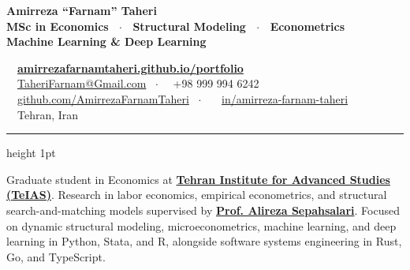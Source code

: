 \documentclass[10pt,a4paper]{article}
\begin{document}
\noindent
\begin{minipage}[b]{0.56\textwidth}
  {\fontsize{21pt}{23pt}\bfseries\color{ink} Amirreza ``Farnam'' Taheri}\\[3pt]
  {\fontsize{8.5pt}{11pt}\bfseries\color{accent}
   MSc in Economics \ $\cdot$ \ Structural Modeling \ $\cdot$ \ Econometrics\\[1.5pt]
   Machine Learning \& Deep Learning}
\end{minipage}%
\hfill
\begin{minipage}[b]{0.43\textwidth}
  \raggedleft\scriptsize\color{muted}
  \faGlobe\ \ \href{https://amirrezafarnamtaheri.github.io/portfolio/index.html}{\textbf{\color{accentdark}amirrezafarnamtaheri.github.io/portfolio}}\\[2pt]
  \faEnvelope\ \ \href{mailto:TaheriFarnam@Gmail.com}{TaheriFarnam@Gmail.com} \ $\cdot$ \ \faPhone*\ +98 999 994 6242\\[2pt]
  \faGithub\ \ \href{https://github.com/AmirrezaFarnamTaheri}{github.com/AmirrezaFarnamTaheri} \ $\cdot$ \ \faLinkedin\ \ \href{https://ir.linkedin.com/in/amirreza-farnam-taheri-2691b1201}{in/amirreza-farnam-taheri}\\[2pt]
  \faMapMarker*\ \ \textcolor{faint}{Tehran, Iran}
\end{minipage}

\vspace{3.5pt}
\hrule height 1pt \relax
\vspace{4pt}

\noindent
{\fontsize{8.5pt}{11pt}\selectfont\color{slate800}
Graduate student in Economics at \textbf{\href{https://teias.institute}{Tehran Institute for Advanced Studies (TeIAS)}}. Research in labor economics, empirical econometrics, and structural search-and-matching models supervised by \textbf{\href{https://www.sepahsalari.com/}{Prof. Alireza Sepahsalari}}. Focused on dynamic structural modeling, microeconometrics, machine learning, and deep learning in Python, Stata, and R, alongside software systems engineering in Rust, Go, and TypeScript.
}

\vspace{3pt}

\setlength{\columnsep}{5mm}
\end{document}
